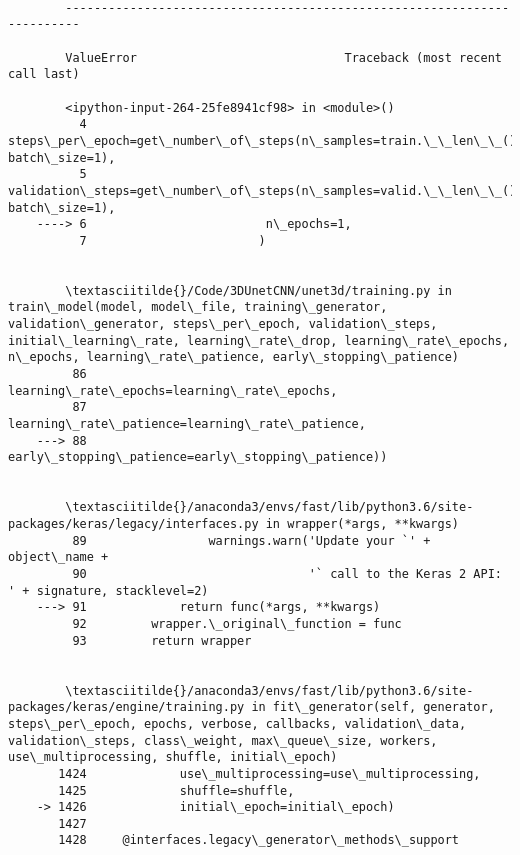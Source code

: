 \documentclass[11pt]{article}
\begin{document}
    \begin{Verbatim}[commandchars=\\\{\}]

        ------------------------------------------------------------------------

        ValueError                             Traceback (most recent call last)

        <ipython-input-264-25fe8941cf98> in <module>()
          4                         steps\_per\_epoch=get\_number\_of\_steps(n\_samples=train.\_\_len\_\_(), batch\_size=1),
          5                         validation\_steps=get\_number\_of\_steps(n\_samples=valid.\_\_len\_\_(), batch\_size=1),
    ----> 6                         n\_epochs=1,
          7                        )


        \textasciitilde{}/Code/3DUnetCNN/unet3d/training.py in train\_model(model, model\_file, training\_generator, validation\_generator, steps\_per\_epoch, validation\_steps, initial\_learning\_rate, learning\_rate\_drop, learning\_rate\_epochs, n\_epochs, learning\_rate\_patience, early\_stopping\_patience)
         86                                                 learning\_rate\_epochs=learning\_rate\_epochs,
         87                                                 learning\_rate\_patience=learning\_rate\_patience,
    ---> 88                                                 early\_stopping\_patience=early\_stopping\_patience))
    

        \textasciitilde{}/anaconda3/envs/fast/lib/python3.6/site-packages/keras/legacy/interfaces.py in wrapper(*args, **kwargs)
         89                 warnings.warn('Update your `' + object\_name +
         90                               '` call to the Keras 2 API: ' + signature, stacklevel=2)
    ---> 91             return func(*args, **kwargs)
         92         wrapper.\_original\_function = func
         93         return wrapper


        \textasciitilde{}/anaconda3/envs/fast/lib/python3.6/site-packages/keras/engine/training.py in fit\_generator(self, generator, steps\_per\_epoch, epochs, verbose, callbacks, validation\_data, validation\_steps, class\_weight, max\_queue\_size, workers, use\_multiprocessing, shuffle, initial\_epoch)
       1424             use\_multiprocessing=use\_multiprocessing,
       1425             shuffle=shuffle,
    -> 1426             initial\_epoch=initial\_epoch)
       1427 
       1428     @interfaces.legacy\_generator\_methods\_support



\end{Verbatim}
\end{document}
